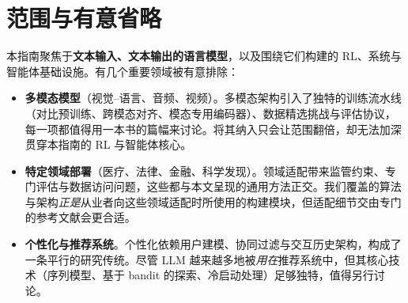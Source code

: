 \documentclass[11pt,a4paper,openany]{book}
\begin{document}
\section*{范围与有意省略}
\label{scope-and-deliberate-omissions}

本指南聚焦于\textbf{文本输入、文本输出的语言模型}，以及围绕它们构建的 RL、系统与智能体基础设施。有几个重要领域被有意排除：

\begin{itemize}
  \item \textbf{多模态模型}（视觉--语言、音频、视频）。多模态架构引入了独特的训练流水线（对比预训练、跨模态对齐、模态专用编码器）、数据精选挑战与评估协议，每一项都值得用一本书的篇幅来讨论。将其纳入只会让范围翻倍，却无法加深贯穿本指南的 RL 与智能体核心。
  \item \textbf{特定领域部署}（医疗、法律、金融、科学发现）。领域适配带来监管约束、专门评估与数据访问问题，这些都与本文呈现的通用方法正交。我们覆盖的算法与架构\emph{正是}从业者向这些领域适配时所使用的构建模块，但适配细节交由专门的参考文献会更合适。
  \item \textbf{个性化与推荐系统}。个性化依赖用户建模、协同过滤与交互历史架构，构成了一条平行的研究传统。尽管 LLM 越来越多地被\emph{用在}推荐系统中，但其核心技术（序列模型、基于 bandit 的探索、冷启动处理）足够独特，值得另行讨论。
\end{itemize}
\end{document}
